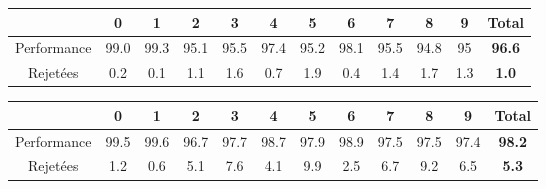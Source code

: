 \documentclass[a4paper,11pt,twoside]{report}
\begin{document}
\begin{center}
\begin{tabular}{ |c||c|c|c|c|c|c|c|c|c|c|c| } 
 \hline
   & 0 & 1 & 2 & 3 & 4 & 5 & 6 & 7 & 8 & 9 & \textbf{Total} \\ 
  \hline
  \hline
 Performance & 99.0 & 99.3 & 95.1 & 95.5 & 97.4 & 95.2 & 98.1 & 95.5 & 94.8 & 95 &  \textbf{96.6} \\
  \hline
 Rejetées & 0.2 & 0.1 & 1.1 & 1.6 & 0.7 & 1.9 & 0.4 & 1.4 & 1.7 & 1.3 & \textbf{1.0} \\
 \hline
\end{tabular}
\end{center}


\begin{center}
\begin{tabular}{ |c||c|c|c|c|c|c|c|c|c|c|c| } 
 \hline
   & 0 & 1 & 2 & 3 & 4 & 5 & 6 & 7 & 8 & 9 & \textbf{Total} \\ 
  \hline
  \hline
 Performance & 99.5 & 99.6 & 96.7 & 97.7 & 98.7 & 97.9 & 98.9 & 97.5 & 97.5 & 97.4 &  \textbf{98.2} \\
  \hline
 Rejetées & 1.2 & 0.6 & 5.1 & 7.6 & 4.1 & 9.9 & 2.5 & 6.7 & 9.2 & 6.5 & \textbf{5.3} \\
 \hline
\end{tabular}
\end{center}



  
\nocite{*} 

%
\end{document}
